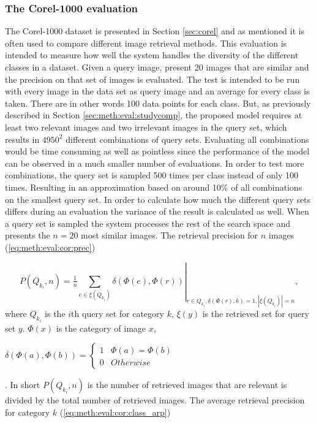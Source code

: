\subsubsection{The Corel-1000 evaluation}
\label{sec:meth:eval:studycomp:corel}

The Corel-1000 dataset is presented in Section \ref{sec:corel} and as mentioned it is often used to compare different image retrieval methods. This evaluation is intended to measure how well the system handles the diversity of the different classes in a dataset. Given a query image, present 20 images that are similar and the precision on that set of images is evaluated. The test is intended to be run with every image in the data set as query image and an average for every class is taken. There are in other words 100 data points for each class. But, as previously described in Section \ref{sec:meth:eval:studycomp}, the proposed model requires at least two relevant images and two irrelevant images in the query set, which results in $4950^2$ different combinations of query sets. Evaluating all combinations would be time consuming as well as pointless since the performance of the model can be observed in a much smaller number of evaluations. In order to test more combinations, the query set is sampled 500 times per class instead of only 100 times. Resulting in an approximation based on around 10\% of all combinations on the smallest query set. In order to calculate how much the different query sets differs during an evaluation the variance of the result is calculated as well. When a query set is sampled the system processes the rest of the search space and presents the $n=20$ most similar images. The retrieval precision for $n$ images (\ref{eq:meth:eval:cor:prec})

\begin{equation}
\label{eq:meth:eval:cor:prec}
P(Q_{k_i}, n) = \left . \tfrac{1}{n}\sum_{e \in \xi(Q_{k_i})} \delta(\Phi(e), \Phi(r)) \right |_{ r \in Q_{k_i},  \delta(\Phi(r), k)=1, |\xi(Q_{k_i})|=n},
\end{equation}
where $Q_{k_i}$ is the $i$th query set for category $k$, $\xi(y)$ is the retrieved set for query set $y$. $\Phi(x)$ is the category of image $x$, \begin{tiny}$\delta(\Phi(a), \Phi(b)) = \left \{ 
\begin{matrix} 
1 & \Phi(a) = \Phi(b) \\
0 & Otherwise
\end{matrix}\right.$\end{tiny}.
 In short $P(Q_{k_i}, n)$ is the number of retrieved images that are relevant is divided by the total number of retrieved images. 
 The average retrieval precision for category $k$ (\ref{eq:meth:eval:cor:class_arp}) 


